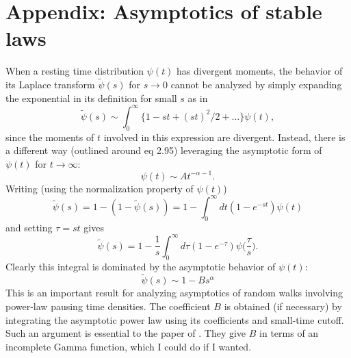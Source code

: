 \documentclass[11pt]{article}
\newcommand\be{\begin{equation}} %
\newcommand\ee{\end{equation}}   %
\begin{document}
\section*{Appendix: Asymptotics of stable laws}
When a resting time distribution $\psi(t)$ has divergent moments, the behavior of its Laplace transform $\tilde{\psi}(s)$ for $s\rightarrow0$ cannot be analyzed by simply expanding the exponential in its definition for small $s$ as in 
\be \tilde{\psi}(s) \sim \int_0^\infty \{1-st + (st)^2/2 + \dots \} \psi(t),\ee
since the moments of $t$ involved in this expression are divergent. 
Instead, there is a different way (outlined around \citet{Weiss1994} eq 2.95) leveraging the asymptotic form of $\psi(t)$ for $t\rightarrow \infty$:
\be \psi(t) \sim  A t^{-\alpha-1}.\ee
Writing (using the normalization property of $\psi(t)$)
\be \tilde{\psi}(s) = 1 - (1- \tilde{\psi}(s)) = 1 - \int_0^\infty dt (1-e^{-st})\psi(t) \ee
and setting $\tau = st$ gives
\be \tilde{\psi}(s) = 1 - \frac{1}{s} \int_0^\infty d\tau (1-e^{-\tau})\psi\big(\frac{\tau}{s}\big).\ee
Clearly this integral is dominated by the asymptotic behavior of $\psi(t)$:
\be \tilde{\psi}(s) \sim 1 - B s^\alpha \ee
This is an important result for analyzing asymptotics of random walks involving power-law pausing time densities.
The coefficient $B$ is obtained (if necessary) by integrating the asymptotic power law using its coefficients and small-time cutoff.
Such an argument is essential to the paper of \citet{Weeks1998}. They give $B$ in terms of an incomplete Gamma function, which I could do if I wanted.

\end{document}
